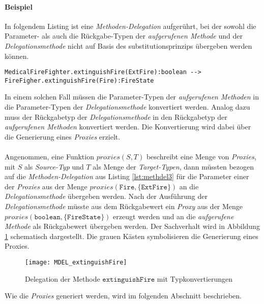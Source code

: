 \paragraph{Beispiel} In folgendem Listing ist eine \emph{Methoden-Delegation} aufgerührt, bei der sowohl die Parameter- als auch die Rückgabe-Typen der \emph{aufgerufenen Methode} und der \emph{Delegationsmethode} nicht auf Basis des \Gls{substitutionsprinzip}s übergeben werden können.
\begin{lstlisting}[style = dsl, caption = Methoden-Delegation mit Typkonvertierung, captionpos = b, label = lst:methdel3 ]
	MedicalFireFighter.extinguishFire(ExtFire):boolean --> FireFigher.extinguishFire(Fire):FireState
\end{lstlisting}
\noindent
In einem solchen Fall müssen die Parameter-Typen der \emph{aufgerufenen Methoden} in die Parameter-Typen der \emph{Delegationsmethode} konvertiert werden. Analog dazu muss der Rückgabetyp der \emph{Delegationsmethode} in den Rückgabetyp der \emph{aufgerufenen Methoden} konvertiert werden. Die Konvertierung wird dabei über die Generierung eines \emph{Proxies} erzielt.
\\\\
Angenommen, eine Funktion $\mathit{proxies(S,T)}$ beschreibt eine Menge von \emph{Proxies}, mit $S$ als \emph{Source-Typ} und $T$ als Menge der \emph{Target-Typen}, dann müssten bezogen auf die \emph{Methoden-Delegation} aus Listing \ref{lst:methdel3} für die Parameter einer der \emph{Proxies} aus der Menge $\mathit{proxies(\texttt{Fire}, \{\texttt{ExtFire}\})}$ an die \emph{Delegationsmethode} übergeben werden. Nach der Ausführung der \emph{Delegationsmethode} müsste aus dem Rückgabewert ein \emph{Proxy} aus der Menge $\mathit{proxies(\texttt{boolean},\{\texttt{FireState}\})}$ erzeugt werden und an die \emph{aufgerufene Methode} als Rückgabewert übergeben werden. Der Sachverhalt wird in Abbildung \ref{fig:DEL_extinguishFire} schematisch dargestellt. Die grauen Kästen symbolisieren die Generierung eines Proxies.
\begin{figure}[H]
\texttt{[image: MDEL\_extinguishFire]}
\caption{Delegation der Methode $\texttt{extinguishFire}$ mit Typkonvertierungen}
\label{fig:DEL_extinguishFire}
\end{figure}
\noindent
Wie die \emph{Proxies} generiert werden, wird im folgenden Abschnitt beschrieben.

